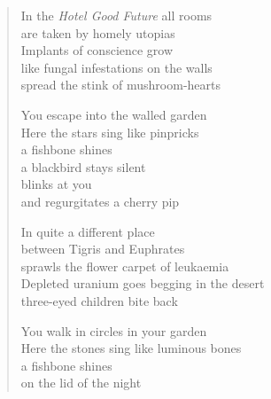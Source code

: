 

\begin{verse}
In the \emph{Hotel Good Future} all rooms\\
are taken by homely utopias\\
Implants of conscience grow\\
like fungal infestations on the walls\\
spread the stink of mushroom-hearts

You escape into the walled garden\\
Here the stars sing like pinpricks\\
a fishbone shines\\
a blackbird stays silent\\
blinks at you\\
and regurgitates a cherry pip

In quite a different place\\
between Tigris and Euphrates\\
sprawls the flower carpet of leukaemia\\
Depleted uranium goes begging in the desert\\
three-eyed children bite back

You walk in circles in your garden\\
Here the stones sing like luminous bones\\
a fishbone shines\\
on the lid of the night
\end{verse}
